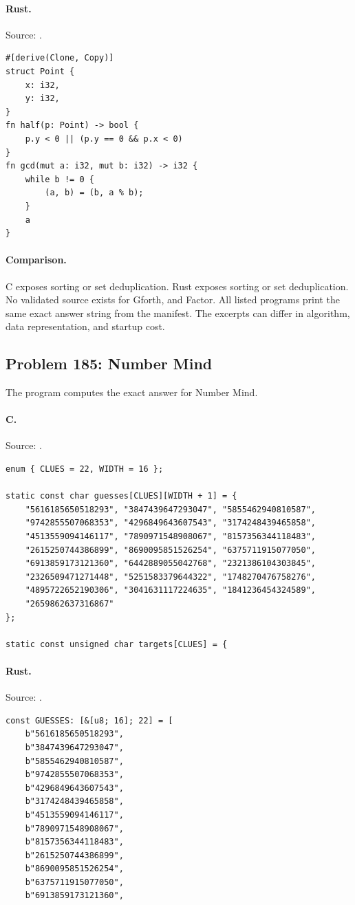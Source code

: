 \paragraph{Rust.} Source: .
\begin{lstlisting}
#[derive(Clone, Copy)]
struct Point {
    x: i32,
    y: i32,
}
fn half(p: Point) -> bool {
    p.y < 0 || (p.y == 0 && p.x < 0)
}
fn gcd(mut a: i32, mut b: i32) -> i32 {
    while b != 0 {
        (a, b) = (b, a % b);
    }
    a
}
\end{lstlisting}

\paragraph{Comparison.}
C exposes sorting or set deduplication. Rust exposes sorting or set deduplication.
No validated source exists for Gforth, and Factor.
All listed programs print the same exact answer string from the manifest. The excerpts can differ in algorithm, data representation, and startup cost.

\subsection{Problem 185: Number Mind}
\label{walkthrough:p185}
The program computes the exact answer for Number Mind.

\paragraph{C.} Source: .
\begin{lstlisting}
enum { CLUES = 22, WIDTH = 16 };

static const char guesses[CLUES][WIDTH + 1] = {
    "5616185650518293", "3847439647293047", "5855462940810587",
    "9742855507068353", "4296849643607543", "3174248439465858",
    "4513559094146117", "7890971548908067", "8157356344118483",
    "2615250744386899", "8690095851526254", "6375711915077050",
    "6913859173121360", "6442889055042768", "2321386104303845",
    "2326509471271448", "5251583379644322", "1748270476758276",
    "4895722652190306", "3041631117224635", "1841236454324589",
    "2659862637316867"
};

static const unsigned char targets[CLUES] = {
\end{lstlisting}

\paragraph{Rust.} Source: .
\begin{lstlisting}
const GUESSES: [&[u8; 16]; 22] = [
    b"5616185650518293",
    b"3847439647293047",
    b"5855462940810587",
    b"9742855507068353",
    b"4296849643607543",
    b"3174248439465858",
    b"4513559094146117",
    b"7890971548908067",
    b"8157356344118483",
    b"2615250744386899",
    b"8690095851526254",
    b"6375711915077050",
    b"6913859173121360",
\end{lstlisting}

